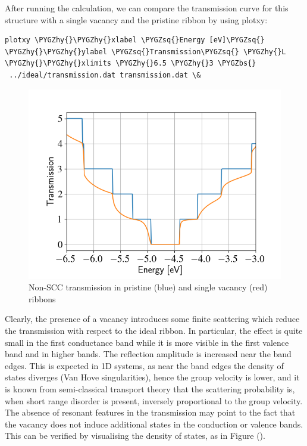 \documentclass[a4paper,11pt,english]{sphinxmanual}
\def\PYGZbs{\char`\\}
\def\PYGZhy{\char`\-}
\def\PYGZsq{\char`\'}
\renewcommand\PYGZsq{\textquotesingle}
\begin{document}
{{After running the
calculation, we can compare the transmission curve for this structure
with a single vacancy and the pristine ribbon by using plotxy:

\begin{Verbatim}[commandchars=\\\{\}]
plotxy \PYGZhy{}\PYGZhy{}xlabel \PYGZsq{}Energy [eV]\PYGZsq{} \PYGZhy{}\PYGZhy{}ylabel \PYGZsq{}Transmission\PYGZsq{} \PYGZhy{}L \PYGZhy{}\PYGZhy{}xlimits \PYGZhy{}6.5 \PYGZhy{}3 \PYGZbs{}
 ../ideal/transmission.dat transmission.dat \&
\end{Verbatim}
\begin{figure}[htbp]
\centering
\capstart
\includegraphics[width=0.700\linewidth]{nonscc-vac-tunn.png}
\caption{Non-SCC transmission in pristine (blue) and single vacancy (red) ribbons}\label{transport:fig-nonscc-vac-tunn}\end{figure}

Clearly, the presence of a vacancy introduces some finite scattering
which reduce the transmission with respect to the ideal ribbon.  In
particular, the effect is quite small in the first conductance band
while it is more visible in the first valence band and in higher
bands.  The reflection amplitude is increased near the band
edges. This is expected in 1D systems, as near the band edges the
density of states diverges (Van Hove singularities), hence the group
velocity is lower, and it is known from semi-classical transport
theory that the scattering probability is, when short range disorder
is present, inversely proportional to the group velocity. The absence
of resonant features in the transmission may point to the fact that
the vacancy does not induce additional states in the conduction or
valence bands. This can be verified by visualising the density of
states, as in Figure {\hyperref[transport:fig-nonscc-vac-dos]{\emph{}}} ().
\begin{figure}[htbp]
\centering
\capstart


\end{figure}}}
\end{document}

